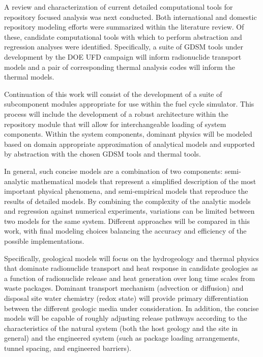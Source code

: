 
A review and characterization of current detailed computational tools for
repository focused analysis was next conducted. Both international and domestic
repository modeling efforts were summarized within the literature review. Of 
these, candidate computational tools with which to perform abstraction and 
regression analyses were identified. Specifically, a suite of \gls{GDSM} tools 
under development by the \gls{DOE} \gls{UFD} campaign will inform  radionuclide 
transport models and a pair of corresponding thermal analysis codes will inform 
the thermal models.
 

Continuation of this work will consist of the development of a suite of 
subcomponent modules appropriate for use within the \Cyclus fuel cycle 
simulator.  This process will include the development of a robust architecture 
within the repository module that will allow for interchangeable loading of 
system components.  Within the system components, dominant physics will be 
modeled based on domain appropriate approximation of analytical models and 
supported by abstraction with the chosen \gls{GDSM} tools and thermal tools. 


In general, such concise models are a combination of two components: 
semi-analytic mathematical models that represent a simplified description of the 
most important physical phenomena, and semi-empirical models that reproduce the 
results of detailed models.  By combining the complexity of the analytic models 
and regression against numerical experiments, variations can be limited between 
two models for the same system.  Different approaches will be compared in this 
work, with final modeling choices balancing the accuracy and efficiency of the 
possible implementations.  


Specifically, geological models will focus on the hydrogeology and thermal 
physics that dominate radionuclide transport and heat response in candidate 
geologies as a function of radionuclide release and heat generation over long 
time scales from waste packages.  Dominant transport mechanism (advection or 
diffusion) and disposal site water chemistry (redox state) will provide primary 
differentiation between the different geologic media under consideration. In 
addition, the concise models will be capable of roughly adjusting release 
pathways according to the characteristics of the natural system (both the host 
geology and the site in general) and the engineered system (such as package 
loading arrangements, tunnel spacing, and engineered barriers).

